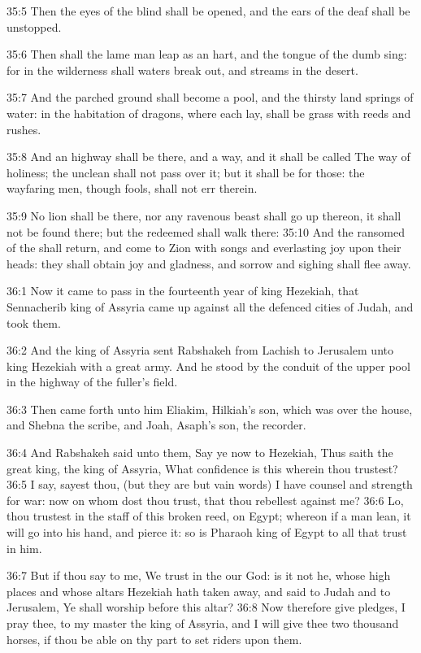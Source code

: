 35:5 Then the eyes of the blind shall be opened, and the ears of the
deaf shall be unstopped.

35:6 Then shall the lame man leap as an hart, and the tongue of the
dumb sing: for in the wilderness shall waters break out, and streams
in the desert.

35:7 And the parched ground shall become a pool, and the thirsty land
springs of water: in the habitation of dragons, where each lay, shall
be grass with reeds and rushes.

35:8 And an highway shall be there, and a way, and it shall be called
The way of holiness; the unclean shall not pass over it; but it shall
be for those: the wayfaring men, though fools, shall not err therein.

35:9 No lion shall be there, nor any ravenous beast shall go up
thereon, it shall not be found there; but the redeemed shall walk
there: 35:10 And the ransomed of the \LORD shall return, and come to
Zion with songs and everlasting joy upon their heads: they shall
obtain joy and gladness, and sorrow and sighing shall flee away.

36:1 Now it came to pass in the fourteenth year of king Hezekiah, that
Sennacherib king of Assyria came up against all the defenced cities of
Judah, and took them.

36:2 And the king of Assyria sent Rabshakeh from Lachish to Jerusalem
unto king Hezekiah with a great army. And he stood by the conduit of
the upper pool in the highway of the fuller's field.

36:3 Then came forth unto him Eliakim, Hilkiah's son, which was over
the house, and Shebna the scribe, and Joah, Asaph's son, the recorder.

36:4 And Rabshakeh said unto them, Say ye now to Hezekiah, Thus saith
the great king, the king of Assyria, What confidence is this wherein
thou trustest?  36:5 I say, sayest thou, (but they are but vain words)
I have counsel and strength for war: now on whom dost thou trust, that
thou rebellest against me?  36:6 Lo, thou trustest in the staff of
this broken reed, on Egypt; whereon if a man lean, it will go into his
hand, and pierce it: so is Pharaoh king of Egypt to all that trust in
him.

36:7 But if thou say to me, We trust in the \LORD our God: is it not
he, whose high places and whose altars Hezekiah hath taken away, and
said to Judah and to Jerusalem, Ye shall worship before this altar?
36:8 Now therefore give pledges, I pray thee, to my master the king of
Assyria, and I will give thee two thousand horses, if thou be able on
thy part to set riders upon them.

